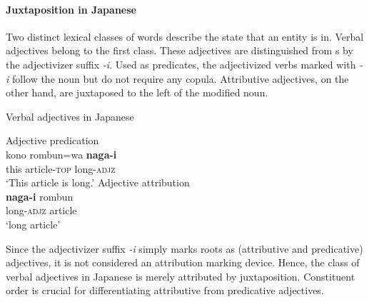 \paragraph*{Juxtaposition in Japanese}
Two distinct lexical classes of words describe the state that an entity is in. Verbal adjectives belong to the first class. These adjectives are distinguished from s by the adjectivizer suffix \textit{-i}. Used as predicates, the adjectivized verbs marked with \textit{-i} follow the noun but do not require any copula. Attributive adjectives, on the other hand, are juxtaposed to the left of the modified noun. 
\begin{exe}
\ex \rm{Verbal adjectives in Japanese \citep[170]{backhouse1984}}
\begin{xlist}
\ex \rm{Adjective predication}\\
\gll	kono rombun=wa \textbf{naga-i}\\
	this article-\textsc{top} long-\textsc{adjz}\\
\glt	‘This article is long.’
\ex \rm{Adjective attribution}\\
\gll	\textbf{naga-i} rombun\\
	long-\textsc{adjz} article\\
\glt	‘long article’
\end{xlist}
\end{exe}
Since the adjectivizer suffix \textit{-i} simply marks  roots as (attributive and predicative) adjectives, it is not considered an attribution marking device. Hence, the class of verbal adjectives in Japanese is merely attributed by juxtaposition. Constituent order is crucial for differentiating attributive from predicative adjectives. 

